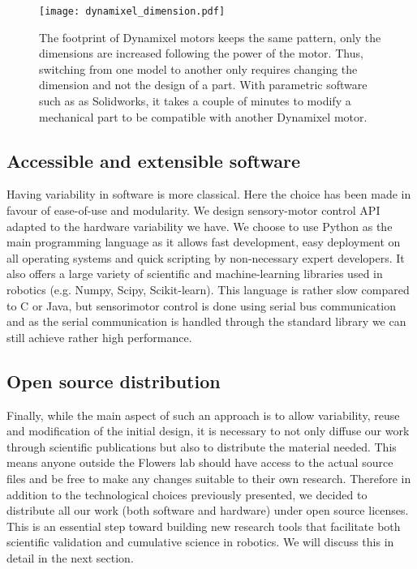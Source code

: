 \begin{figure}[tb]
    \begin{center}
        \texttt{[image: dynamixel\_dimension.pdf]}
    \end{center}
    \caption{The footprint of Dynamixel motors keeps the same pattern, only the dimensions are increased following the power of the motor. Thus, switching from one model to another only requires changing the dimension and not the design of a part. With parametric software such as as Solidworks, it takes a couple of minutes to modify a mechanical part to be compatible with another Dynamixel motor.}
    \label{fig:dynamixel_dimension}
\end{figure}


\subsection{Accessible and extensible software} %

Having variability in software is more classical. Here the choice has been made in favour of ease-of-use and modularity. We design sensory-motor control API adapted to the hardware variability we have. We choose to use Python as the main programming language as it allows fast development, easy deployment on all operating systems and quick scripting by non-necessary expert developers. It also offers a large variety of scientific and machine-learning libraries used in robotics (e.g. Numpy, Scipy, Scikit-learn).
This language is rather slow compared to C or Java, but sensorimotor control is done using serial bus communication and as the serial communication is handled through the standard library we can still achieve rather high performance.

\subsection{Open source distribution} %

Finally, while the main aspect of such an approach is to allow variability, reuse and modification of the initial design, it is necessary to not only diffuse our work through scientific publications but also to distribute the material needed.
This means anyone outside the Flowers lab should have access to the actual source files and be free to make any changes suitable to their own research. Therefore in addition to the technological choices previously presented, we decided to distribute all our work (both software and hardware) under open source licenses.
This is an essential step toward building new research tools that facilitate both scientific validation and cumulative science in robotics. We will discuss this in detail in the next section.


